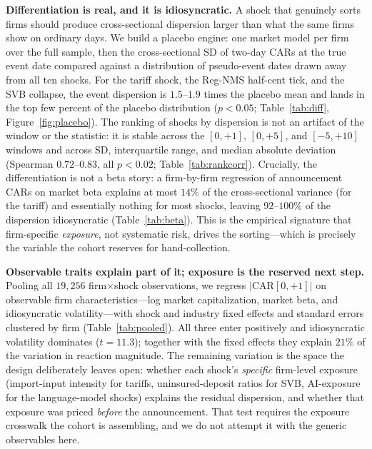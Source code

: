 \documentclass[12pt]{article}
\begin{document}
\textbf{Differentiation is real, and it is idiosyncratic.} A shock that genuinely sorts firms
should produce cross-sectional dispersion larger than what the same firms show on ordinary days.
We build a placebo engine: one market model per firm over the full sample, then the cross-sectional
SD of two-day CARs at the true event date compared against a distribution of pseudo-event dates
drawn away from all ten shocks. For the tariff shock, the Reg-NMS half-cent tick, and the SVB
collapse, the event dispersion is $1.5$--$1.9$ times the placebo mean and lands in the top few
percent of the placebo distribution ($p<0.05$; Table~\ref{tab:diff}, Figure~\ref{fig:placebo}).
The ranking of shocks by dispersion is not an artifact of the window or the statistic: it is stable
across the $[0,+1]$, $[0,+5]$, and $[-5,+10]$ windows and across SD, interquartile range, and
median absolute deviation (Spearman $0.72$--$0.83$, all $p<0.02$; Table~\ref{tab:rankcorr}).
Crucially, the differentiation is not a beta story: a firm-by-firm regression of announcement CARs
on market beta explains at most $14\%$ of the cross-sectional variance (for the tariff) and
essentially nothing for most shocks, leaving $92$--$100\%$ of the dispersion idiosyncratic
(Table~\ref{tab:beta}). This is the empirical signature that firm-specific \emph{exposure}, not
systematic risk, drives the sorting---which is precisely the variable the cohort reserves for
hand-collection.

\textbf{Observable traits explain part of it; exposure is the reserved next step.} Pooling all
$19{,}256$ firm$\times$shock observations, we regress $|\text{CAR}[0,+1]|$ on observable firm
characteristics---log market capitalization, market beta, and idiosyncratic volatility---with shock
and industry fixed effects and standard errors clustered by firm (Table~\ref{tab:pooled}). All three
enter positively and idiosyncratic volatility dominates ($t=11.3$); together with the fixed effects
they explain $21\%$ of the variation in reaction magnitude. The remaining variation is the space the
design deliberately leaves open: whether each shock's \emph{specific} firm-level exposure (import-input
intensity for tariffs, uninsured-deposit ratios for SVB, AI-exposure for the language-model shocks)
explains the residual dispersion, and whether that exposure was priced \emph{before} the
announcement. That test requires the exposure crosswalk the cohort is assembling, and we do not
attempt it with the generic observables here.
\end{document}
